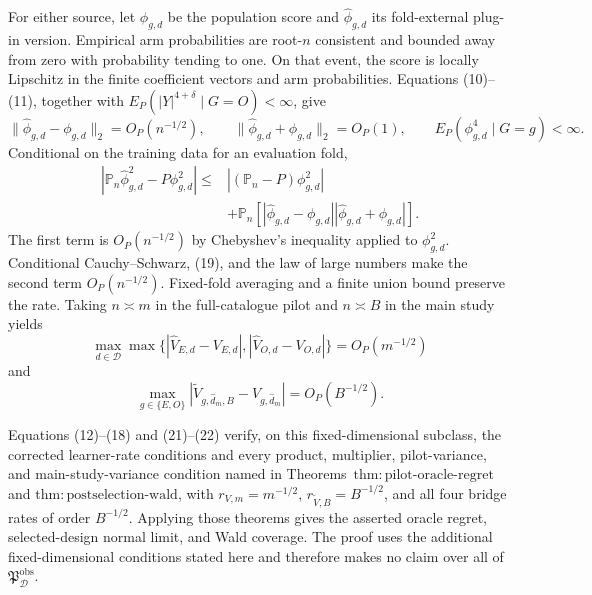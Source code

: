 For either source, let \(\phi_{g,d}\) be the population score and \(\widehat\phi_{g,d}\) its fold-external plug-in version.  Empirical arm probabilities are root-\(n\) consistent and bounded away from zero with probability tending to one.  On that event, the score is locally Lipschitz in the finite coefficient vectors and arm probabilities.  Equations (10)--(11), together with \(E_P(|Y|^{4+\delta}\mid G=O)<\infty\), give
\[
 \|\widehat\phi_{g,d}-\phi_{g,d}\|_2=O_P(n^{-1/2}),
 \qquad
 \|\widehat\phi_{g,d}+\phi_{g,d}\|_2=O_P(1),
 \qquad
 E_P(\phi_{g,d}^4\mid G=g)<\infty.                            \tag{19}
\]
Conditional on the training data for an evaluation fold,
\[
\begin{aligned}
 |\mathbb P_n\widehat\phi_{g,d}^2-P\phi_{g,d}^2|
 \le{}&| (\mathbb P_n-P)\phi_{g,d}^2|\\
 &+\mathbb P_n\!\left[
 |\widehat\phi_{g,d}-\phi_{g,d}|
 |\widehat\phi_{g,d}+\phi_{g,d}|
 \right].
\end{aligned}                                                   \tag{20}
\]
The first term is \(O_P(n^{-1/2})\) by Chebyshev's inequality applied to \(\phi_{g,d}^2\).  Conditional Cauchy--Schwarz, (19), and the law of large numbers make the second term \(O_P(n^{-1/2})\).  Fixed-fold averaging and a finite union bound preserve the rate.  Taking \(n\asymp m\) in the full-catalogue pilot and \(n\asymp B\) in the main study yields
\[
 \max_{d\in\mathcal D}\max\bigl\{
 |\widehat V_{E,d}-V_{E,d}|,
 |\widehat V_{O,d}-V_{O,d}|\bigr\}=O_P(m^{-1/2})              \tag{21}
\]
and
\[
 \max_{g\in\{E,O\}}
 |\widetilde V_{g,\widehat d_m,B}-V_{g,\widehat d_m}|
 =O_P(B^{-1/2}).                                               \tag{22}
\]

Equations (12)--(18) and (21)--(22) verify, on this fixed-dimensional subclass, the corrected learner-rate conditions and every product, multiplier, pilot-variance, and main-study-variance condition named in Theorems~\(\mathrm{thm{:}pilot\text{-}oracle\text{-}regret}\) and \(\mathrm{thm{:}postselection\text{-}wald}\), with \(r_{V,m}=m^{-1/2}\), \(r_{\widetilde V,B}=B^{-1/2}\), and all four bridge rates of order \(B^{-1/2}\).  Applying those theorems gives the asserted oracle regret, selected-design normal limit, and Wald coverage.  The proof uses the additional fixed-dimensional conditions stated here and therefore makes no claim over all of \(\mathfrak P_{\mathcal D}^{\mathrm{obs}}\).
